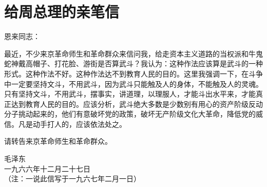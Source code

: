 \section[给周总理的亲笔信（一九六六年十二月二十七日）]{给周总理的亲笔信}


恩来同志：

最近，不少来京革命师生和革命群众来信问我，给走资本主义道路的当权派和牛鬼蛇神戴高帽子、打花脸、游街是否算武斗？我认为：这种作法应该算是武斗的一种形式。这种作法不好。这种作法达不到教育人民的目的。这里我强调一下，在斗争中一定要坚持文斗，不用武斗，因为武斗只能触及人的身体，不能触及人的灵魂。只有坚持文斗，不用武斗，摆事实，讲道理，以理服人，才能斗出水平来，才能真正达到教育人民的目的。应该分析，武斗绝大多数是少数别有用心的资产阶级反动分子挑动起来的，他们有意破坏党的政策，破坏无产阶级文化大革命，降低党的威信。凡是动手打人的，应该依法处之。

请转告来京革命师生和革命群众。

{\raggedleft 毛泽东\\一九六六年十二月二十七日\\（注：一说此信写于一九六七年二月一日）\par}


